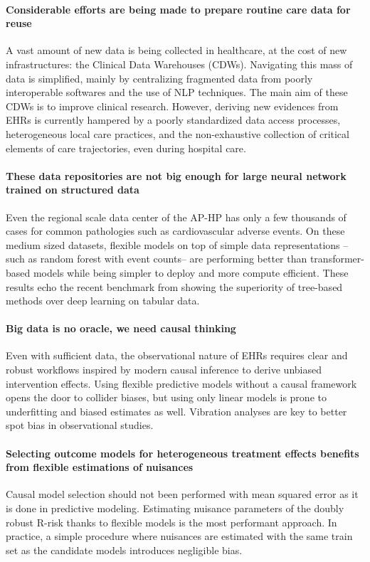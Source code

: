 \documentclass[french,12pt,twoside,a4paper]{book}
\begin{document}
\paragraph{Considerable efforts are being made to prepare routine care data for reuse}
A vast amount of new data is being collected in healthcare, at the cost of new
infrastructures: the Clinical Data Warehouses (CDWs). Navigating this mass of
data is simplified, mainly by centralizing fragmented data from poorly
interoperable softwares and the use of NLP techniques. The main aim of these
CDWs is to improve clinical research. However, deriving new evidences from EHRs
is currently hampered  by a poorly standardized data access processes,
heterogeneous local care practices, and the non-exhaustive collection of
critical elements of care trajectories, even during hospital care.
%
\paragraph{These data repositories are not big enough for large neural network
  trained on structured data} Even the regional scale data center of the AP-HP
has only a few thousands of cases for common pathologies such as
cardiovascular adverse events. On these medium sized datasets, flexible models
on top of simple data representations --such as random forest with event
counts-- are performing better than transformer-based models while being
simpler to deploy and more compute efficient. These results echo the recent
benchmark from \cite{grinsztajn2022tree} showing the superiority of tree-based
methods over deep learning on tabular data.
%
\paragraph{Big data is no oracle, we need causal thinking} Even with sufficient
data, the observational nature of EHRs requires clear and robust workflows
inspired by modern causal inference to derive unbiased intervention effects.
Using flexible predictive models without a causal framework opens the door to
collider biases, but using only linear models is prone to underfitting and
biased estimates as well. Vibration analyses are key to better spot bias in
observational studies.

%
\paragraph{Selecting outcome models for heterogeneous treatment effects benefits
  from flexible estimations of nuisances} Causal model selection should not been
performed with mean squared error as it is done in predictive modeling.
Estimating nuisance parameters of the doubly robust R-risk thanks to flexible
models is the most performant approach. In practice, a simple procedure where
nuisances are estimated with the same train set as the candidate models
introduces negligible bias.
\end{document}
